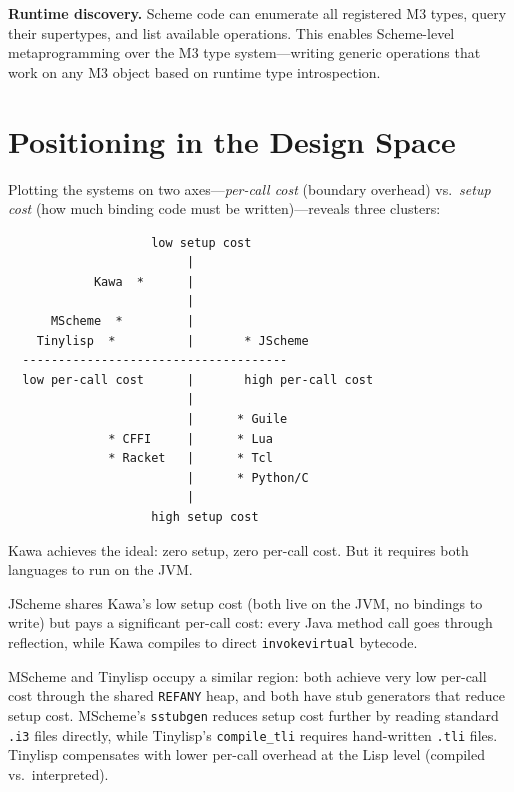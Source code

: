 \documentclass[11pt]{article}
\begin{document}
\textbf{Runtime discovery.}  Scheme code can enumerate all registered
M3 types, query their supertypes, and list available operations.  This
enables Scheme-level metaprogramming over the M3 type system---writing
generic operations that work on any M3 object based on runtime type
introspection.


\section{Positioning in the Design Space}
\label{sec:positioning}

Plotting the systems on two axes---\emph{per-call cost} (boundary
overhead) vs.\ \emph{setup cost} (how much binding code must be
written)---reveals three clusters:

\begin{samepage}
\begin{verbatim}
                    low setup cost
                         |
            Kawa  *      |
                         |
      MScheme  *         |
    Tinylisp  *          |       * JScheme
  -------------------------------------
  low per-call cost      |       high per-call cost
                         |
                         |      * Guile
              * CFFI     |      * Lua
              * Racket   |      * Tcl
                         |      * Python/C
                         |
                    high setup cost
\end{verbatim}
\end{samepage}

Kawa achieves the ideal: zero setup, zero per-call cost.  But it
requires both languages to run on the JVM.

JScheme shares Kawa's low setup cost (both live on the JVM, no
bindings to write) but pays a significant per-call cost: every Java
method call goes through reflection, while Kawa compiles to direct
\texttt{invokevirtual} bytecode.

MScheme and Tinylisp occupy a similar region: both achieve very low
per-call cost through the shared \texttt{REFANY} heap, and both have
stub generators that reduce setup cost.  MScheme's \texttt{sstubgen}
reduces setup cost further by reading standard \texttt{.i3} files
directly, while Tinylisp's \texttt{compile\_tli} requires hand-written
\texttt{.tli} files.  Tinylisp compensates with lower per-call
overhead at the Lisp level (compiled vs.\ interpreted).
\end{document}
